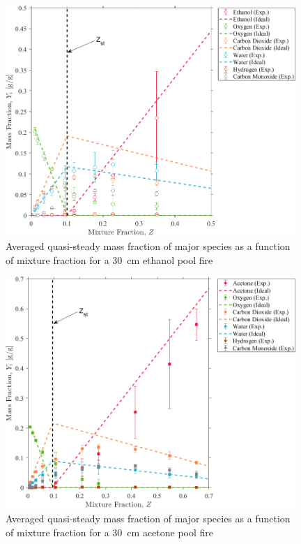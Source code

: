 \documentclass[12pt]{article}
\begin{document}
\begin{figure}[!]
	\centering
\includegraphics[width=11.0cm,keepaspectratio]{Ethanol_OVERALL_Mass_Frac_Mix_Frac.png}
	\caption[Averaged quasi-steady mass fraction of major species as a function of mixture fraction for a \SI{30}{cm} ethanol pool fire]{Averaged quasi-steady mass fraction of major species as a function of mixture fraction for a \SI{30}{cm} ethanol pool fire}
	\label{fig:Ethanol_Mix_Frac}
\end{figure}

\begin{figure}[!]
	\centering
\includegraphics[width=11.0cm,keepaspectratio]{Acetone_OVERALL_Mass_Frac_Mix_Frac.png}
	\caption[Averaged quasi-steady mass fraction of major species as a function of mixture fraction for a \SI{30}{cm} acetone pool fire]{Averaged quasi-steady mass fraction of major species as a function of mixture fraction for a \SI{30}{cm} acetone pool fire}
	\label{fig:Acetone_Mix_Frac}
\end{figure}
\end{document}
